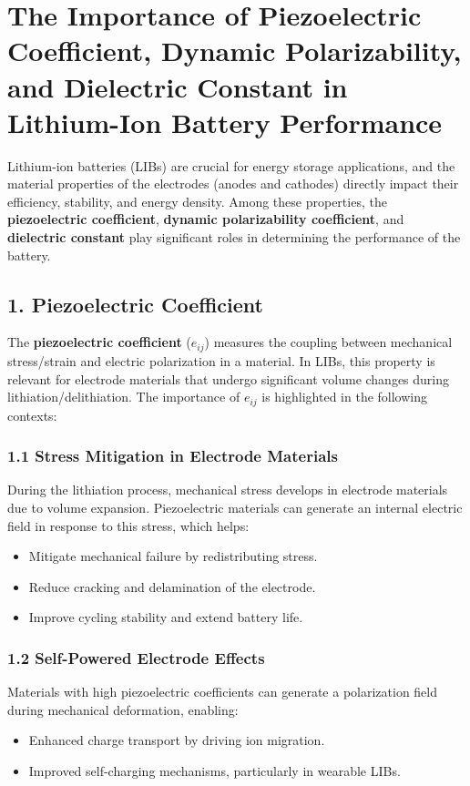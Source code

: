 \documentclass[12pt]{article}
\begin{document}
\section*{The Importance of Piezoelectric Coefficient, Dynamic Polarizability, and Dielectric Constant in Lithium-Ion Battery Performance}

Lithium-ion batteries (LIBs) are crucial for energy storage applications, and the material properties of the electrodes (anodes and cathodes) directly impact their efficiency, stability, and energy density. Among these properties, the \textbf{piezoelectric coefficient}, \textbf{dynamic polarizability coefficient}, and \textbf{dielectric constant} play significant roles in determining the performance of the battery.

\subsection*{1. Piezoelectric Coefficient}

The \textbf{piezoelectric coefficient} ($e_{ij}$) measures the coupling between mechanical stress/strain and electric polarization in a material. In LIBs, this property is relevant for electrode materials that undergo significant volume changes during lithiation/delithiation. The importance of $e_{ij}$ is highlighted in the following contexts:

\subsubsection*{1.1 Stress Mitigation in Electrode Materials}
During the lithiation process, mechanical stress develops in electrode materials due to volume expansion. Piezoelectric materials can generate an internal electric field in response to this stress, which helps:
\begin{itemize}
    \item Mitigate mechanical failure by redistributing stress.
    \item Reduce cracking and delamination of the electrode.
    \item Improve cycling stability and extend battery life.
\end{itemize}

\subsubsection*{1.2 Self-Powered Electrode Effects}
Materials with high piezoelectric coefficients can generate a polarization field during mechanical deformation, enabling:
\begin{itemize}
    \item Enhanced charge transport by driving ion migration.
    \item Improved self-charging mechanisms, particularly in wearable LIBs.
\end{itemize}
\end{document}
